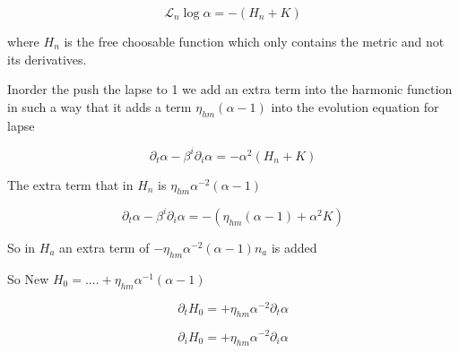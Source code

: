 \documentclass[11pt]{article}
\begin{document}
\[
\mathcal{L}_n \log \alpha = - (H_n +K)
\]

where $H_n$ is the free choosable function which only contains the metric and not its derivatives.

Inorder the push the lapse to 1 we add an extra term into the harmonic function in such a way that it adds a term $\eta_{hm}(\alpha-1)$ into the evolution equation for lapse

\[
\partial_t \alpha -\beta^i \partial_i \alpha= -\alpha^2(H_n + K)
\]

The extra term that in $H_n$ is $\eta_{hm} \alpha^{-2} (\alpha-1)$

\[
\partial_t \alpha -\beta^i \partial_i \alpha= -(\eta_{hm} (\alpha-1) + \alpha^2 K)
\]

So in $H_a$ an extra term of $-\eta_{hm} \alpha^{-2} (\alpha - 1) n_a$ is added

So New $H_0=.... + \eta_{hm} \alpha^{-1} (\alpha-1)$

\[
\partial_t H_0 = +\eta_{hm} \alpha^{-2} \partial_t \alpha
\]

\[
\partial_i H_0 = +\eta_{hm} \alpha^{-2} \partial_i \alpha
\]

\printbibliography
\end{document}
